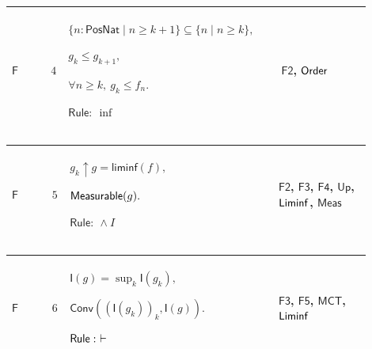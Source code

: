 \documentclass[12pt,reqno]{amsart}
\theoremstyle{blueplain}
\numberwithin{equation}{section}
\begin{document}
{\scriptsize \setlength{\parskip}{0pt}\nointerlineskip
\noindent 
\begin{tabular}{|@{}>{\centering\arraybackslash}m{0.10658\linewidth}|>{\centering\arraybackslash}m{0.03553\linewidth}|>{\centering\arraybackslash}m{0.52105\linewidth}|>{\centering\arraybackslash}m{0.23684\linewidth}|}
\hline
\hypertarget{proof:F4}{$\displaystyle \mathsf{F}$} & $\displaystyle 4$ & $%
\displaystyle \{n:\mathsf{PosNat}\mid n\ge k+1\}\subseteq\{n\mid n\ge k\},$%
\par$\displaystyle g_k\le g_{k+1},$\par$\displaystyle \forall n\ge k,\
g_k\le f_n.$\par$\displaystyle \mathsf{Rule}:\ \inf$ & \hyperlink{proof:F2}{$%
\displaystyle \mathsf{F2}$}, \hyperlink{ax:Order}{$\displaystyle \mathsf{%
Order}$} \\ \hline
\end{tabular}%
}

{\scriptsize \setlength{\parskip}{0pt}\nointerlineskip
\noindent 
\begin{tabular}{|@{}>{\centering\arraybackslash}m{0.10658\linewidth}|>{\centering\arraybackslash}m{0.03553\linewidth}|>{\centering\arraybackslash}m{0.52105\linewidth}|>{\centering\arraybackslash}m{0.23684\linewidth}|}
\hline
\hypertarget{proof:F5}{$\displaystyle \mathsf{F}$} & $\displaystyle 5$ & $%
\displaystyle g_k\uparrow g=\mathsf{liminf}(f),$\par$\displaystyle \mathsf{%
Measurable}(g).$\par$\displaystyle \mathsf{Rule}:\ \land I$ & \hyperlink{proof:F2}%
{$\displaystyle \mathsf{F2}$}, \hyperlink{proof:F3}{$\displaystyle \mathsf{F3%
}$}, \hyperlink{proof:F4}{$\displaystyle \mathsf{F4}$}, \hyperlink{def:Up}{$%
\displaystyle \mathsf{Up}$}, \hyperlink{def:Liminf}{$\displaystyle \mathsf{%
Liminf}$}, \hyperlink{lem:Meas}{$\displaystyle \mathsf{Meas}$} \\ \hline
\end{tabular}%
}

{\scriptsize \setlength{\parskip}{0pt}\nointerlineskip
\noindent 
\begin{tabular}{|@{}>{\centering\arraybackslash}m{0.10658\linewidth}|>{\centering\arraybackslash}m{0.03553\linewidth}|>{\centering\arraybackslash}m{0.52105\linewidth}|>{\centering\arraybackslash}m{0.23684\linewidth}|}
\hline
\hypertarget{proof:F6}{$\displaystyle \mathsf{F}$} & $\displaystyle 6$ & $%
\displaystyle \mathsf{I}(g)=\sup_k\mathsf{I}(g_k),$\par$\displaystyle 
\mathsf{Conv}((\mathsf{I}(g_k))_k,\mathsf{I}(g)).$\par$\displaystyle \mathsf{%
Rule}:\ \vdash$ & \hyperlink{proof:F3}{$\displaystyle \mathsf{F3}$}, 
\hyperlink{proof:F5}{$\displaystyle \mathsf{F5}$}, \hyperlink{lem:MCT}{$%
\displaystyle \mathsf{MCT}$}, \hyperlink{lem:Liminf}{$\displaystyle \mathsf{%
Liminf}$} \\ \hline
\end{tabular}%
}
\end{document}
